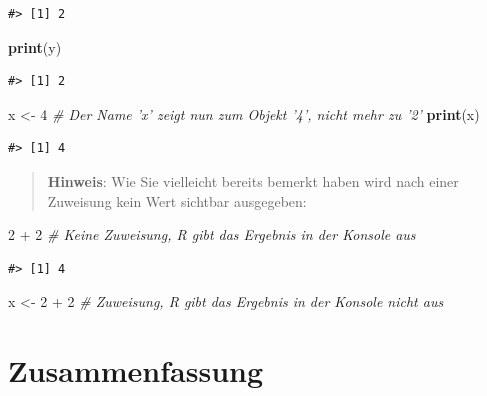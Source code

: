 \documentclass[]{tufte-book}
\newenvironment{Shaded}{}{}
\newcommand{\KeywordTok}[1]{\textcolor[rgb]{0.00,0.44,0.13}{\textbf{#1}}}
\newcommand{\DecValTok}[1]{\textcolor[rgb]{0.25,0.63,0.44}{#1}}
\newcommand{\StringTok}[1]{\textcolor[rgb]{0.25,0.44,0.63}{#1}}
\newcommand{\CommentTok}[1]{\textcolor[rgb]{0.38,0.63,0.69}{\textit{#1}}}
\newcommand{\OperatorTok}[1]{\textcolor[rgb]{0.40,0.40,0.40}{#1}}
\newcommand{\NormalTok}[1]{#1}
\begin{document}
\begin{verbatim}
#> [1] 2
\end{verbatim}

\begin{Shaded}
\begin{Highlighting}[]
\KeywordTok{print}\NormalTok{(y)}
\end{Highlighting}
\end{Shaded}

\begin{verbatim}
#> [1] 2
\end{verbatim}

\begin{Shaded}
\begin{Highlighting}[]
\NormalTok{x <-}\StringTok{ }\DecValTok{4}  \CommentTok{# Der Name 'x' zeigt nun zum Objekt '4', nicht mehr zu '2'}
\KeywordTok{print}\NormalTok{(x)}
\end{Highlighting}
\end{Shaded}

\begin{verbatim}
#> [1] 4
\end{verbatim}

\begin{quote}
\textbf{Hinweis}: Wie Sie vielleicht bereits bemerkt haben wird nach
einer Zuweisung kein Wert sichtbar ausgegeben:
\end{quote}

\begin{Shaded}
\begin{Highlighting}[]
\DecValTok{2} \OperatorTok{+}\StringTok{ }\DecValTok{2}  \CommentTok{# Keine Zuweisung, R gibt das Ergebnis in der Konsole aus}
\end{Highlighting}
\end{Shaded}

\begin{verbatim}
#> [1] 4
\end{verbatim}

\begin{Shaded}
\begin{Highlighting}[]
\NormalTok{x <-}\StringTok{ }\DecValTok{2} \OperatorTok{+}\StringTok{ }\DecValTok{2}  \CommentTok{# Zuweisung, R gibt das Ergebnis in der Konsole nicht aus}
\end{Highlighting}
\end{Shaded}

\section{Zusammenfassung}\label{zusammenfassung}
\end{document}
